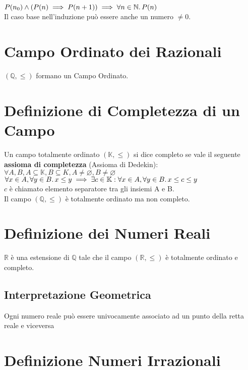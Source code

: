 \documentclass[a4paper, twoside, italian, 11pt]{book}
\newcommand{\N}{\mathbb{N}}
\newcommand{\Q}{\mathbb{Q}}
\newcommand{\K}{\mathbb{K}}
\newcommand{\R}{\mathbb{R}}
\let\emptyset\varnothing
\begin{document}
\indent
$P(n_0) \land (P(n) \implies P(n + 1)) \implies \forall n \in \N \ldotp P(n)$ \\

\noindent
Il caso base nell'induzione può essere anche un numero $\neq 0$.



\section{Campo Ordinato dei Razionali}
\noindent
$(\Q, \leq)$ formano un Campo Ordinato.


\section{Definizione di Completezza di un Campo}

\noindent
Un campo totalmente ordinato $(\K, \leq)$ si dice completo se vale il seguente \textbf{assioma di completezza} (Assioma di Dedekin): \\

$\forall A, B, A \subseteq \K, B \subseteq K, A \neq \emptyset, B \neq \emptyset$ \\

$\forall x \in A, \forall y \in B \ldotp x \leq y \implies \exists c \in \K : \forall x \in A, \forall y \in B \ldotp x \leq c \leq y$ \\

\noindent
$c$ è chiamato elemento separatore tra gli insiemi A e B. \\

\noindent
Il campo $(\Q, \leq)$ è totalmente ordinato ma non completo.


\section{Definizione dei Numeri Reali}

\noindent
$\R$ è una estensione di $\Q$ tale che il campo $(\R, \leq)$ è totalmente ordinato e completo.


\subsection{Interpretazione Geometrica}

\noindent
Ogni numero reale può essere univocamente associato ad un punto della retta reale e viceversa



\section{Definizione Numeri Irrazionali}
\end{document}
